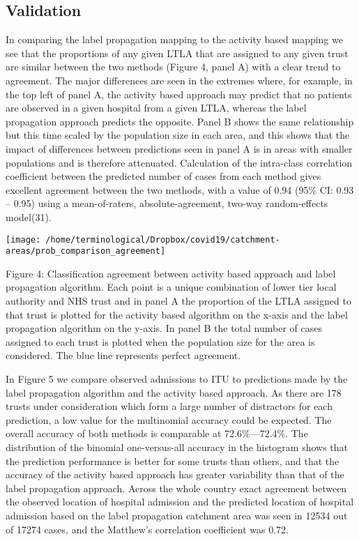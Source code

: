 \documentclass[
]{article}
\begin{document}
\hypertarget{validation-1}{%
\subsection{Validation}\label{validation-1}}

In comparing the label propagation mapping to the activity based mapping
we see that the proportions of any given LTLA that are assigned to any
given trust are similar between the two methods (Figure 4, panel A) with
a clear trend to agreement. The major differences are seen in the
extremes where, for example, in the top left of panel A, the activity
based approach may predict that no patients are observed in a given
hospital from a given LTLA, whereas the label propagation approach
predicts the opposite. Panel B shows the same relationship but this time
scaled by the population size in each area, and this shows that the
impact of differences between predictions seen in panel A is in areas
with smaller populations and is therefore attenuated. Calculation of the
intra-class correlation coefficient between the predicted number of
cases from each method gives excellent agreement between the two
methods, with a value of 0.94 (95\% CI: 0.93 -- 0.95) using a
mean-of-raters, absolute-agreement, two-way random-effects model(31).

\begin{center}\texttt{[image: /home/terminological/Dropbox/covid19/catchment-areas/prob\_comparison\_agreement]} \end{center}

Figure 4: Classification agreement between activity based approach and
label propagation algorithm. Each point is a unique combination of lower
tier local authority and NHS trust and in panel A the proportion of the
LTLA assigned to that trust is plotted for the activity based algorithm
on the x-axis and the label propagation algorithm on the y-axis. In
panel B the total number of cases assigned to each trust is plotted when
the population size for the area is considered. The blue line represents
perfect agreement.

In Figure 5 we compare observed admissions to ITU to predictions made by
the label propagation algorithm and the activity based approach. As
there are 178 trusts under consideration which form a large number of
distractors for each prediction, a low value for the multinomial
accuracy could be expected. The overall accuracy of both methods is
comparable at 72.6\%---72.4\%. The distribution of the binomial
one-versus-all accuracy in the histogram shows that the prediction
performance is better for some trusts than others, and that the accuracy
of the activity based approach has greater variability than that of the
label propagation approach. Across the whole country exact agreement
between the observed location of hospital admission and the predicted
location of hospital admission based on the label propagation catchment
area was seen in 12534 out of 17274 cases, and the Matthew's correlation
coefficient was 0.72.
\end{document}
